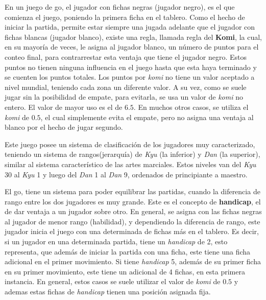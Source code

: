 \documentclass[11pt,twoside,spanish]{report} %
\begin{document}
En un juego de go, el jugador con fichas negras (jugador negro), es el que comienza el juego, poniendo la primera ficha en el tablero.
Como el hecho de iniciar la partida, permite estar siempre una jugada adelante que el jugador con fichas blancas (jugador blanco), existe una regla, llamada regla del \textbf{Komi}, la cual, en su mayor\'ia de veces, le asigna al jugador blanco, un n\'umero de puntos para el conteo final, para contrarrestar esta ventaja que tiene el jugador negro.
Estos puntos no tienen ninguna influencia en el juego hasta que esta haya terminado y se cuenten los puntos totales.
Los puntos por \emph{komi} no tiene un valor aceptado a nivel mundial, teniendo cada zona un diferente valor.
A su vez, como se suele jugar sin la posibilidad de empate, para evitarla, se usa un valor de \emph{komi} no entero.
El valor de mayor uso es el de $6.5$.
En muchos otros casos, se utiliza el \emph{komi} de $0.5$, el cual simplemente evita el empate, pero no asigna una ventaja al blanco por el hecho de jugar segundo.


Este juego posee un sistema de clasificaci\'on de los jugadores muy caracterizado, teniendo un sistema de rangos(jerarqu\'ia) de \textit{Kyu} (la inferior) y \textit{Dan} (la superior), similar al sistema caracter\'istico de las artes marciales. Estos niveles van del \textit{Kyu} 30 al \textit{Kyu} 1 y luego del \textit{Dan} 1 al \textit{Dan} 9, ordenados de principiante a maestro.

El go, tiene un sistema para poder equilibrar las partidas, cuando la diferencia de rango entre los dos jugadores es muy grande.
Este es el concepto de \textbf{handicap}, el de dar ventaja a un jugador sobre otro.
En general, se asigna con las fichas negras al jugador de menor rango (habilidad), y dependiendo la diferencia de rango, este jugador inicia el juego con una determinada de fichas m\'as en el tablero.
Es decir, si un jugador en una determinada partida, tiene un \textit{handicap} de 2, esto representa, que adem\'as de iniciar la partida con una ficha, este tiene una ficha adicional en el primer movimiento.
Si tiene \textit{handicap} 5, adem\'as  de su primer ficha en su primer movimiento, este tiene un adicional de 4 fichas, en esta primera instancia.
En general, estos casos se suele utilizar el valor de \emph{komi} de $0.5$ y ademas estas fichas de \textit{handicap} tienen una posici\'on asignada fija.
\end{document}
